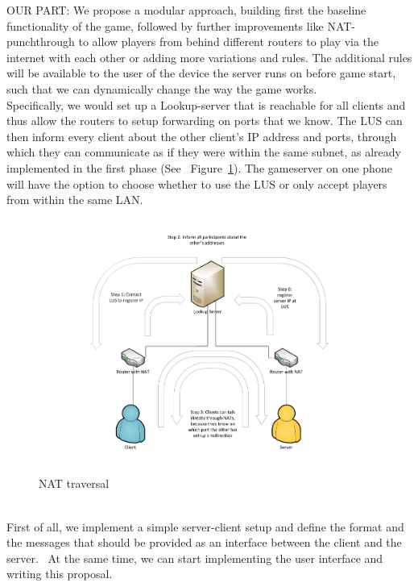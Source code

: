 \documentclass{report}
\newcommand{\lfig}[1]{\label{fig:#1}}
\newcommand{\rfig}[1]{Figure~\ref{fig:#1}}
\begin{document}
OUR PART:
We propose a modular approach, building first the baseline functionality of the game, followed by further improvements like NAT-punchthrough to allow players from behind different routers to play via the internet with each other or adding more variations and rules. The additional rules will be available to the user of the device the server runs on before game start, such that we can dynamically change the way the game works.\\
Specifically, we would set up a Lookup-server that is reachable for all clients and thus allow the routers to setup forwarding on ports that we know. The LUS can then inform every client about the other client's IP address and ports, through which they can communicate as if they were within the same subnet, as already implemented in the first phase (See ~\rfig{nat}). The gameserver on one phone will have the option to choose whether to use the LUS or only accept players from within the same LAN.\\
\begin{figure}[h]
	\centering
    \includegraphics[width=\columnwidth]{NATholepunching.pdf}
    \lfig{nat}
    \vspace{-5mm} %
	\caption{NAT traversal}
\end{figure}
\\
First of all, we implement a simple server-client setup and define the format and the messages that should be provided as an interface between the client and the server.~\cite{messaging} At the same time, we can start implementing the user interface and writing this proposal.\\
\end{document}
